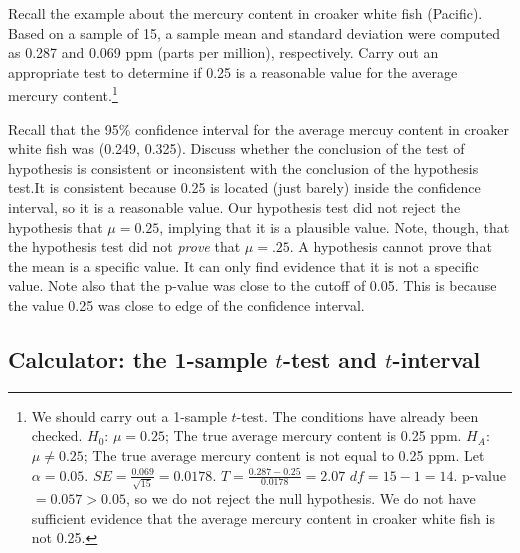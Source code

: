\begin{exercise}Recall the example about the mercury content in croaker white fish (Pacific). Based on a sample of 15, a sample mean and standard deviation were computed as 0.287 and 0.069 ppm (parts per million), respectively. Carry out an appropriate test to determine if 0.25 is a reasonable value for the average mercury content.\footnote{We should carry out a 1-sample $t$-test. The conditions have already been checked. $H_0$: $\mu=0.25$; The true average mercury content is 0.25 ppm. $H_A$: $\mu \ne 0.25$; The true average mercury content is not equal to 0.25 ppm. Let $\alpha=0.05$. $SE = \frac{0.069}{\sqrt{15}} = 0.0178$. $T=\frac{0.287-0.25}{0.0178}=2.07$  $df=15-1=14$. p-value$=0.057>0.05$, so we do not reject the null hypothesis. We do not have sufficient evidence that the average mercury content in croaker white fish is not 0.25.}
\end{exercise}

\textA{\newpage}

\begin{example}{Recall that the 95\% confidence interval for the average mercuy content in croaker white fish was (0.249, 0.325). Discuss whether the conclusion of the test of hypothesis is consistent or inconsistent with the conclusion of the hypothesis test.}It is consistent because 0.25 is located (just barely) inside the confidence interval, so it is a reasonable value. Our hypothesis test did not reject the hypothesis that $\mu=0.25$, implying that it is a plausible value. Note, though, that the hypothesis test did not \emph{prove} that $\mu=.25$. A hypothesis cannot prove that the mean is a specific value. It can only find evidence that it is not a specific value. Note also that the p-value was close to the cutoff of 0.05. This is because the value 0.25 was close to edge of the confidence interval.
\end{example}

\subsection{Calculator: the 1-sample $t$-test and $t$-interval}

